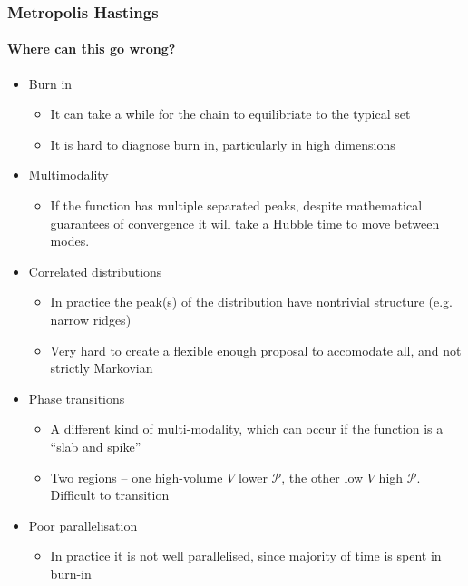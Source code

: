 \documentclass[aspectratio=169]{beamer}
\begin{document}
\begin{frame}
    \frametitle{Metropolis Hastings } 
    \framesubtitle{Where can this go wrong?}
    \begin{itemize}
        \item Burn in
            \begin{itemize}
                \item It can take a while for the chain to equilibriate to the typical set
                \item It is hard to diagnose burn in, particularly in high dimensions
            \end{itemize}
        \item Multimodality
            \begin{itemize}
                \item If the function has multiple separated peaks, despite mathematical guarantees of convergence it will take a Hubble time to move between modes.
            \end{itemize}
        \item Correlated distributions
            \begin{itemize}
                \item In practice the peak(s) of the distribution have nontrivial structure (e.g. narrow ridges)
                \item Very hard to create a flexible enough proposal to accomodate all, and not strictly Markovian
            \end{itemize}
        \item Phase transitions
            \begin{itemize}
                \item A different kind of multi-modality, which can occur if the function is a ``slab and spike''
                \item Two regions -- one high-volume $V$ lower $\mathcal{P}$, the other low $V$ high $\mathcal{P}$. Difficult to transition
            \end{itemize}
        \item Poor parallelisation
            \begin{itemize}
                \item In practice it is not well parallelised, since majority of time is spent in burn-in
            \end{itemize}
    \end{itemize}
\end{frame}
\end{document}

